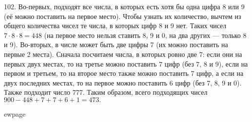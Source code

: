 102. Во-первых, подходят все числа, в которых есть хотя бы одна цифра 8 или 9 (её можно поставить на первое место). Чтобы узнать их количество, вычтем из общего количества чисел те числа, в которых цифр 8 и 9 нет. Таких чисел $7\cdot8\cdot8=448$ (на первое место нельзя ставить 8, 9 и 0, на два других --- только 8 и 9). Во-вторых, в числе может быть две цифры 7 (их можно поставить на первые 2 места). Сначала посчитаем числа, в которых ровно две 7: если они на первых двух местах, то на третье можно поставить 7 цифр (без 7, 8 и 9), если на первом и третьем, то на второе место также можно поставить 7 цифр, а если на двух последних местах, то на первое можно поставить 6 цифр (без 7, 8, 9 и 0). Также подходит число 777.
Таким образом, всего подходящих чисел $900-448+7+7+6+1=473.$

ewpage
